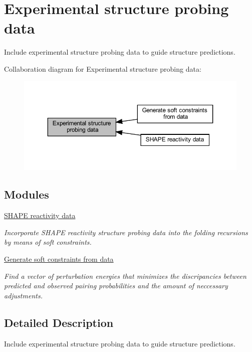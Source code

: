 \hypertarget{group__probing__data}{}\section{Experimental structure probing data}
\label{group__probing__data}


Include experimental structure probing data to guide structure predictions.  


Collaboration diagram for Experimental structure probing data\+:
\nopagebreak
\begin{figure}[H]
\begin{center}
\leavevmode
\includegraphics[width=350pt]{group__probing__data}
\end{center}
\end{figure}
\subsection*{Modules}
\begin{DoxyCompactItemize}
\item 
\hyperlink{group__SHAPE__reactivities}{S\+H\+A\+P\+E reactivity data}
\begin{DoxyCompactList}\small\item\em Incorporate S\+H\+A\+PE reactivity structure probing data into the folding recursions by means of soft constraints. \end{DoxyCompactList}\item 
\hyperlink{group__perturbation}{Generate soft constraints from data}
\begin{DoxyCompactList}\small\item\em Find a vector of perturbation energies that minimizes the discripancies between predicted and observed pairing probabilities and the amount of neccessary adjustments. \end{DoxyCompactList}\end{DoxyCompactItemize}


\subsection{Detailed Description}
Include experimental structure probing data to guide structure predictions. 


